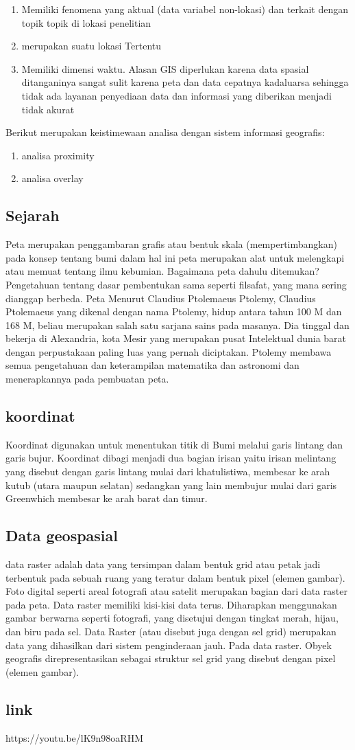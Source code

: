 \begin{enumerate}
\item Memiliki fenomena yang aktual (data variabel non-lokasi) dan terkait dengan topik topik di lokasi penelitian 
\item merupakan suatu lokasi Tertentu 
\item Memiliki dimensi waktu.  Alasan GIS diperlukan karena data spasial ditanganinya sangat sulit karena peta dan data cepatnya kadaluarsa sehingga tidak ada layanan penyediaan data dan informasi yang diberikan menjadi tidak akurat
\end{enumerate}
Berikut merupakan keistimewaan analisa dengan sistem informasi geografis:
\begin{enumerate}
\item analisa proximity
\item analisa overlay
\end{enumerate}
\subsection{Sejarah}
Peta merupakan penggambaran grafis atau bentuk skala (mempertimbangkan) pada konsep tentang bumi dalam hal ini peta merupakan alat untuk melengkapi atau memuat tentang ilmu kebumian.  Bagaimana peta dahulu ditemukan?  Pengetahuan tentang dasar pembentukan sama seperti filsafat, yang mana sering dianggap berbeda.  Peta Menurut Claudius Ptolemaeus Ptolemy, Claudius Ptolemaeus yang dikenal dengan nama Ptolemy, hidup antara tahun 100 M dan 168 M, beliau merupakan salah satu sarjana sains pada masanya.  Dia tinggal dan bekerja di Alexandria, kota Mesir yang merupakan pusat Intelektual dunia barat dengan perpustakaan paling luas yang pernah diciptakan.  Ptolemy membawa semua pengetahuan dan keterampilan matematika dan astronomi dan menerapkannya pada pembuatan peta.
\subsection{koordinat}
Koordinat digunakan untuk menentukan titik di Bumi melalui garis lintang dan garis bujur.  Koordinat dibagi menjadi dua bagian irisan yaitu irisan melintang yang disebut dengan garis lintang mulai dari khatulistiwa, membesar ke arah kutub (utara maupun selatan) sedangkan yang lain membujur mulai dari garis Greenwhich membesar ke arah barat dan timur.

\subsection{Data geospasial}
data raster adalah data yang tersimpan dalam bentuk grid atau petak jadi terbentuk pada sebuah ruang yang teratur dalam bentuk pixel (elemen gambar).  Foto digital seperti areal fotografi atau satelit merupakan bagian dari data raster pada peta.  Data raster memiliki kisi-kisi data terus. Diharapkan menggunakan gambar berwarna seperti fotografi, yang disetujui dengan tingkat merah, hijau, dan biru pada sel.  Data Raster (atau disebut juga dengan sel grid) merupakan data yang dihasilkan dari sistem penginderaan jauh.  Pada data raster.  Obyek geografis direpresentasikan sebagai struktur sel grid yang disebut dengan pixel (elemen gambar).
\subsection{link}
https://youtu.be/lK9n98oaRHM
